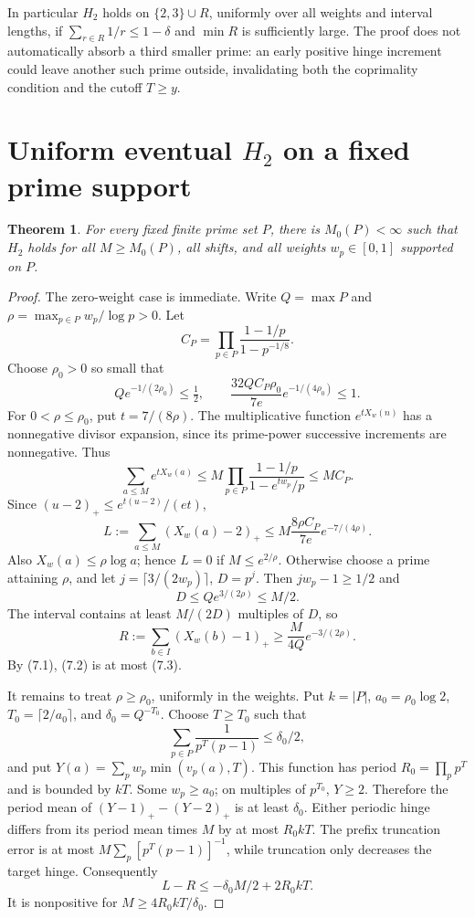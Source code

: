 \documentclass[11pt,a4paper]{article}
\newtheorem{theorem}{Theorem}[section]
\theoremstyle{remark}
\newcommand{\pos}[1]{\left(#1\right)_+}
\begin{document}
In particular \(H_2\) holds on \(\{2,3\}\cup R\), uniformly over all
weights and interval lengths, if \(\sum_{r\in R}1/r\le1-\delta\)
and \(\min R\) is sufficiently large. The proof does not automatically
absorb a third smaller prime: an early positive hinge increment
could leave another such prime outside, invalidating both the
coprimality condition and the cutoff \(T\ge y\).

\section{Uniform eventual \(H_2\) on a fixed prime support}

\begin{theorem}
\label{thm:fixed}
For every fixed finite prime set \(P\), there is \(M_0(P)<\infty\)
such that \(H_2\) holds for all \(M\ge M_0(P)\), all shifts, and all
weights \(w_p\in[0,1]\) supported on \(P\).
\end{theorem}
\begin{proof}
The zero-weight case is immediate. Write \(Q=\max P\) and
\(\rho=\max_{p\in P}w_p/\log p>0\). Let
\[
 C_P=\prod_{p\in P}\frac{1-1/p}{1-p^{-1/8}}.
 \]
Choose \(\rho_0>0\) so small that
\[
 Qe^{-1/(2\rho_0)}\le\tfrac12,\qquad
 \frac{32QC_P\rho_0}{7e}e^{-1/(4\rho_0)}\le1.
 \tag{7.1}
\]
For \(0<\rho\le\rho_0\), put \(t=7/(8\rho)\). The multiplicative
function \(e^{tX_w(n)}\) has a nonnegative divisor expansion, since
its prime-power successive increments are nonnegative. Thus
\[
 \sum_{a\le M}e^{tX_w(a)}
 \le M\prod_{p\in P}\frac{1-1/p}{1-e^{tw_p}/p}
 \le MC_P.
 \]
Since \(\pos{u-2}\le e^{t(u-2)}/(et)\),
\[
 L:=\sum_{a\le M}\pos{X_w(a)-2}
 \le M\frac{8\rho C_P}{7e}e^{-7/(4\rho)}.
 \tag{7.2}
\]
Also \(X_w(a)\le\rho\log a\); hence \(L=0\) if \(M\le e^{2/\rho}\).
Otherwise choose a prime attaining \(\rho\), and let
\(j=\lceil3/(2w_p)\rceil\), \(D=p^j\).
Then \(jw_p-1\ge1/2\) and
\[
 D\le Qe^{3/(2\rho)}\le M/2.
 \]
The interval contains at least \(M/(2D)\) multiples of \(D\), so
\[
 R:=\sum_{b\in I}\pos{X_w(b)-1}
 \ge\frac{M}{4Q}e^{-3/(2\rho)}.
 \tag{7.3}
\]
By (7.1), (7.2) is at most (7.3).

It remains to treat \(\rho\ge\rho_0\), uniformly in the weights.
Put \(k=|P|\), \(a_0=\rho_0\log2\),
\(T_0=\lceil2/a_0\rceil\), and \(\delta_0=Q^{-T_0}\).
Choose \(T\ge T_0\) such that
\[
 \sum_{p\in P}\frac1{p^T(p-1)}\le\delta_0/2,
 \]
and put \(Y(a)=\sum_pw_p\min(v_p(a),T)\).
This function has period \(R_0=\prod_pp^T\) and is bounded by \(kT\).
Some \(w_p\ge a_0\); on multiples of \(p^{T_0}\), \(Y\ge2\).
Therefore the period mean of
\(\pos{Y-1}-\pos{Y-2}\) is at least \(\delta_0\).
Either periodic hinge differs from its period mean times \(M\) by
at most \(R_0kT\). The prefix truncation error is at most
\(M\sum_p[p^T(p-1)]^{-1}\), while truncation only decreases the
target hinge. Consequently
\[
 L-R\le-\delta_0M/2+2R_0kT.
 \]
It is nonpositive for \(M\ge4R_0kT/\delta_0\).
\end{proof}
\end{document}
